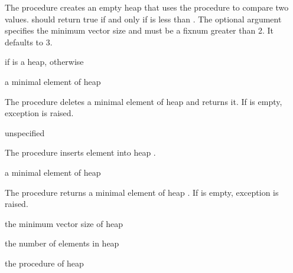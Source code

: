 The  procedure creates an empty heap that uses the  procedure
to compare two values.  should return true if and
only if  is less than . The optional  argument specifies the
minimum vector size and must be a fixnum greater than 2. It defaults to 3.

\begin{procedure}
\end{procedure}
\returns{}  if  is a heap,  otherwise

\begin{procedure}
\end{procedure}
\returns{} a minimal element of heap 

The  procedure deletes a minimal element of heap  and
returns it. If  is empty, exception  is raised.

\begin{procedure}
\end{procedure}
\returns{} unspecified

The  procedure inserts element  into heap .

\begin{procedure}
\end{procedure}
\returns{} a minimal element of heap 

The  procedure returns a minimal element of heap . If  is
empty, exception  is raised.

\begin{procedure}
\end{procedure}
\returns{} the minimum vector size of heap 

\begin{procedure}
\end{procedure}
\returns{} the number of elements in heap 

\begin{procedure}
\end{procedure}
\returns{} the  procedure of heap 
